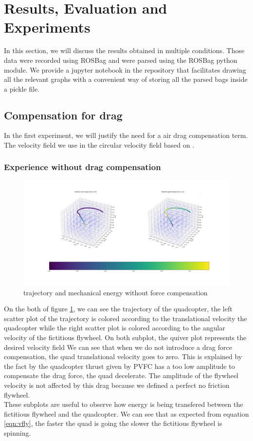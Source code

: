 \section{Results, Evaluation and Experiments}
In this section, we will discuss the results obtained in multiple conditions. Those data were recorded using ROSBag and were parsed using the ROSBag python module.
We provide a jupyter notebook in the repository that facilitates drawing all the relevant graphs with a convenient way of storing all the parsed bags inside a pickle file.

\subsection{Compensation for drag}
In the first experiment, we will justify the need for a air drag compensation term. 
The velocity field we use in the circular velocity field based on \cite{mcinnes2003velocity}.
\subsubsection{Experience without drag compensation}
\begin{figure}[h!]
   \centering
   \includegraphics[width=\linewidth]{Images/python-noforcecomp.png}
   \caption{trajectory and mechanical energy without force compensation }
   \label{fig:pythonnocomp}
\end{figure}
On the both of figure \ref{fig:pythonnocomp}, we can see the trajectory of the quadcopter, the left scatter plot of the trajectory is colored according to the
translational velocity the quadcopter while the right scatter plot is colored according to the angular velocity of the fictitious flywheel.
On both subplot, the quiver plot represents the desired velocity field
We can see that when we do not introduce a drag force compensation, the quad translational velocity goes to zero. 
This is explained by the fact by the quadcopter thrust given by PVFC has a too low amplitude to compensate the drag force, the quad decelerate.
The amplitude of the flywheel velocity is not affected by this drag because we defined a perfect no friction flywheel.\\
These subplots are useful to observe how energy is being transfered between the fictitious flywheel and the quadcopter. 
We can see that as expected from equation \ref{eqn:vfly}, the faster the quad is going the slower the fictitious flywheel is spinning.

